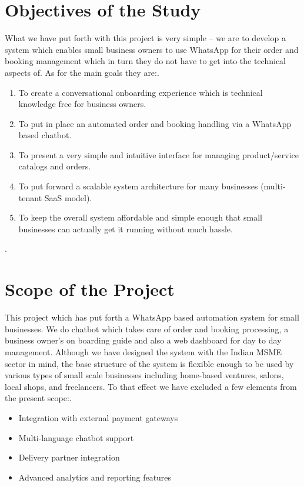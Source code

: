 
\section{Objectives of the Study}

What we have put forth with this project is very simple -- we are to develop a system which enables small business owners to use WhatsApp for their order and booking management which in turn they do not have to get into the technical aspects of. As for the main goals they are:.

\begin{enumerate}

    \item To create a conversational onboarding experience which is technical knowledge free for business owners. 
    \item To put in place an automated order and booking handling via a WhatsApp based chatbot. \item To present a very simple and intuitive interface for managing product/service catalogs and orders. 
    \item To put forward a scalable system architecture for many businesses (multi-tenant SaaS model). 
    \item To keep the overall system affordable and simple enough that small businesses can actually get it running without much hassle.

\end{enumerate}.



\section{Scope of the Project}

This project which has put forth a WhatsApp based automation system for small businesses. We do chatbot which takes care of order and booking processing, a business owner's on boarding guide and also a web dashboard for day to day management. Although we have designed the system with the Indian MSME sector in mind, the base structure of the system is flexible enough to be used by various types of small scale businesses including home-based ventures, salons, local shops, and freelancers. To that effect we have excluded a few elements from the present scope:.

\begin{itemize}

\item Integration with external payment gateways

\item Multi-language chatbot support

\item Delivery partner integration

\item Advanced analytics and reporting features

\end{itemize}